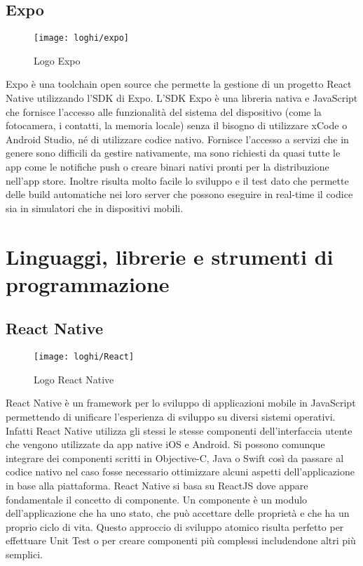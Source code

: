 \subsection{Expo} \label{subsec:expo}
	\begin{figure}[H] 
		\centering
		\texttt{[image: loghi/expo]}
		\caption{Logo Expo}
	\end{figure}
Expo è una toolchain open source che permette la gestione di un progetto React 
Native utilizzando l'SDK di Expo. L'SDK Expo è una libreria nativa e JavaScript 
che fornisce l'accesso alle funzionalità del sistema del dispositivo (come la 
fotocamera, i contatti, la memoria locale) senza il bisogno di utilizzare xCode 
o Android Studio, né di utilizzare codice nativo. Fornisce l'accesso a servizi 
che in genere sono difficili da gestire nativamente, ma sono richiesti da quasi 
tutte le app come le notifiche push o creare binari nativi pronti per la 
distribuzione nell'app store.
Inoltre risulta molto facile lo sviluppo e il test dato che permette delle 
build automatiche nei loro server che possono eseguire in real-time il codice 
sia in simulatori che in dispositivi mobili.


\section{Linguaggi, librerie e strumenti di programmazione}

\subsection{React Native}
\begin{figure}[H] 
	\centering
	\texttt{[image: loghi/React]}
	\caption{Logo React Native}
\end{figure}
React Native è un framework per lo sviluppo di applicazioni mobile in JavaScript 
permettendo di unificare l'esperienza di sviluppo su diversi sistemi operativi. 
Infatti React Native utilizza gli stessi le stesse componenti dell'interfaccia 
utente che vengono utilizzate da app native iOS e Android.
Si possono comunque integrare dei componenti scritti in Objective-C, 
Java o Swift così da passare al codice nativo nel caso fosse necessario 
ottimizzare alcuni aspetti dell'applicazione in base alla piattaforma. 
React Native si basa su ReactJS dove appare fondamentale il concetto di 
componente. Un componente è un modulo dell'applicazione che ha uno stato, 
che può accettare delle proprietà e che ha un proprio ciclo di vita. 
Questo approccio di sviluppo atomico risulta perfetto per effettuare Unit Test 
o per creare componenti più complessi includendone altri più semplici.

